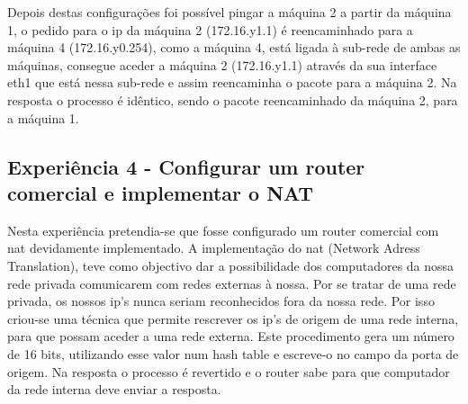 \documentclass[a4paper]{article}
\begin{document}
Depois destas configurações foi possível pingar a máquina 2 a partir da máquina 1, o pedido para o ip da máquina 2 (172.16.y1.1) é reencaminhado para a máquina 4 (172.16.y0.254), como a máquina 4, está ligada à sub-rede de ambas as máquinas, consegue aceder a máquina 2 (172.16.y1.1) através da sua interface eth1 que está nessa sub-rede e assim reencaminha o pacote para a máquina 2. Na resposta o processo é idêntico, sendo o pacote reencaminhado da máquina 2, para a máquina 1.



\subsection{Experiência 4 - Configurar um router comercial e implementar o NAT}
Nesta experiência pretendia-se que fosse configurado um router comercial com nat devidamente implementado. A implementação do nat (Network Adress Translation), teve como objectivo dar a possibilidade dos computadores da nossa rede privada comunicarem com redes externas à nossa. Por se tratar de uma rede privada, os nossos ip’s nunca seriam reconhecidos fora da nossa rede. Por isso criou-se uma técnica que permite rescrever os ip’s de origem  de uma rede interna, para que possam aceder a uma rede externa. Este procedimento gera um número de 16 bits, utilizando esse valor num hash table e escreve-o no campo da porta de origem. Na resposta o processo é revertido e o router sabe para que computador da rede interna deve enviar a resposta.
\end{document}
